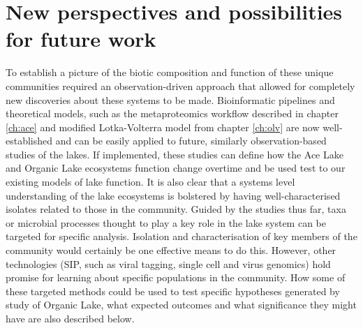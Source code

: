 \section{New perspectives and possibilities for future work}
To establish a picture of the biotic composition and function of these unique communities required an observation-driven approach that allowed for completely new discoveries about these systems to be made.
Bioinformatic pipelines and theoretical models, such as the metaproteomics workflow described in chapter \ref{ch:ace} and modified Lotka-Volterra model from chapter \ref{ch:olv} are now well-established and can be easily applied to future, similarly observation-based studies of the lakes.
If implemented, these studies can define how the Ace Lake and Organic Lake ecosystems function change overtime and be used test to our existing models of lake function.
It is also clear that a systems level understanding of the lake ecosystems is bolstered by having well-characterised isolates related to those in the community.
Guided by the studies thus far, taxa or microbial processes thought to play a key role in the lake system can be targeted for specific analysis.
Isolation and characterisation of key members of the community would certainly be one effective means to do this.
However, other technologies (SIP, such as viral tagging, single cell and virus genomics) hold promise for learning about specific populations in the community.
How some of these targeted methods could be used to test specific hypotheses generated by study of Organic Lake, what expected outcomes and  what significance they might have are also described below.

